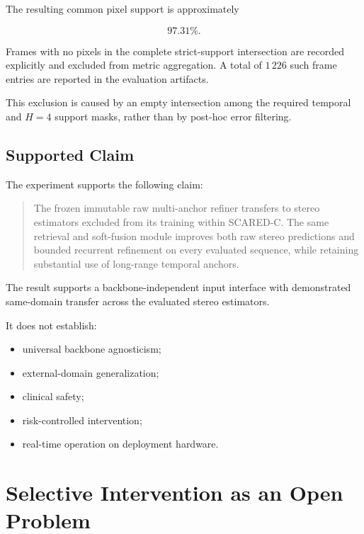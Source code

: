 \documentclass[11pt,a4paper]{article}
\begin{document}
The resulting common pixel support is approximately

\begin{equation}
97.31\%.
\end{equation}

Frames with no pixels in the complete strict-support intersection are
recorded explicitly and excluded from metric aggregation.
A total of \(1\,226\) such frame entries are reported in the evaluation
artifacts.

This exclusion is caused by an empty intersection among the required
temporal and \(H=4\) support masks, rather than by post-hoc error
filtering.

\subsection{Supported Claim}

The experiment supports the following claim:

\begin{quote}
The frozen immutable raw multi-anchor refiner transfers to stereo
estimators excluded from its training within SCARED-C.
The same retrieval and soft-fusion module improves both raw stereo
predictions and bounded recurrent refinement on every evaluated
sequence, while retaining substantial use of long-range temporal
anchors.
\end{quote}

The result supports a backbone-independent input interface with
demonstrated same-domain transfer across the evaluated stereo
estimators.

It does not establish:

\begin{itemize}
    \item universal backbone agnosticism;
    \item external-domain generalization;
    \item clinical safety;
    \item risk-controlled intervention;
    \item real-time operation on deployment hardware.
\end{itemize}

\section{Selective Intervention as an Open Problem}
\label{sec:open_safety}
\end{document}
